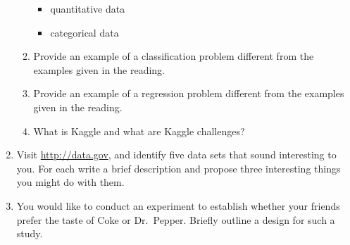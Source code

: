 \documentclass[12pt]{article}
\begin{document}
\begin{enumerate}
\begin{enumerate}
      \begin{itemize}
        \item quantitative data
        \item categorical data
      \end{itemize}
      \item Provide an example of a classification problem different from the examples given in the reading.
      \item Provide an example of a regression problem different from the examples given in the reading.
      \item What is Kaggle and what are Kaggle challenges?
    \end{enumerate}
    \item Visit \url{http://data.gov}, and identify five data sets that sound interesting to you. For each write a brief description
    and propose three interesting things you might do with them.
    \item You would like to conduct an experiment to establish whether your friends prefer the taste of Coke or Dr.\ Pepper. Briefly outline
    a design for such a study.
  \end{enumerate}
\end{document}
